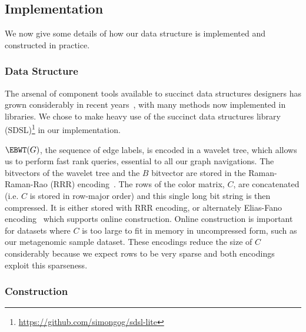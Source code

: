 \subsection{Implementation}
\label{subsec:implementation}

We now give some details of how our data structure is implemented and constructed in practice.

\subsubsection{Data Structure}

The arsenal of component tools available to succinct data structures designers has grown considerably in recent years~\citep{Navarro16}, with many methods now implemented in libraries. We chose to make heavy use of the succinct data structures library (SDSL)\footnote{\url{https://github.com/simongog/sdsl-lite}} 
in our implementation.

\(\EBWT (G)\), the sequence of edge labels, is encoded in a wavelet tree, which allows us to perform fast rank queries, essential to all our graph navigations. The bitvectors of the wavelet tree  and the $B$ bitvector are stored in the Raman-Raman-Rao (RRR) encoding~\citep{RRR07}.
The rows of the color matrix, $C$, are concatenated (i.e. $C$ is stored in row-major order) and this single long bit string is then compressed.  It is either stored with RRR encoding,  or alternately Elias-Fano encoding~\citep{elias1974efficient,fano1971number,bitvector} which supports online construction.  Online construction is important for datasets where $C$ is too large to fit in memory in uncompressed form, such as our metagenomic sample dataset.  These encodings reduce the size of $C$ considerably because we expect rows to be very sparse
and both encodings exploit this sparseness. 

\subsubsection{Construction}

